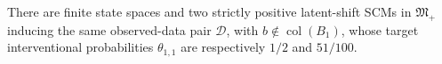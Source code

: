 There are finite state spaces and two strictly positive latent-shift SCMs in \(\mathfrak M_{+}\) inducing the same observed-data pair \(\mathcal D\), with \(b\notin\operatorname{col}(B_1)\), whose target interventional probabilities \(\theta_{1,1}\) are respectively \(1/2\) and \(51/100\).
